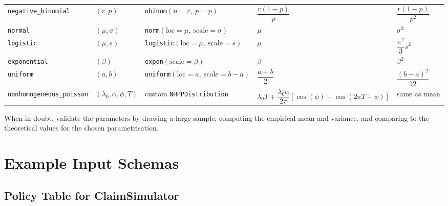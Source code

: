 \begin{longtable}[htbp]
\begin{tabularx}{\textwidth}{llllX}
  \texttt{negative\_binomial} 
  & $(r, p)$ 
  & \texttt{nbinom}$(n=r,\ p=p)$ 
  & $\dfrac{r(1-p)}{p}$ 
  & $\dfrac{r(1-p)}{p^2}$ \\
  
  \texttt{normal} 
  & $(\mu, \sigma)$ 
  & \texttt{norm}$(\text{loc}=\mu,\ \text{scale}=\sigma)$ 
  & $\mu$ 
  & $\sigma^2$ \\
  
  \texttt{logistic} 
  & $(\mu, s)$ 
  & \texttt{logistic}$(\text{loc}=\mu,\ \text{scale}=s)$ 
  & $\mu$ 
  & $\dfrac{\pi^2}{3}s^2$ \\
  
  \texttt{exponential} 
  & $(\beta)$ 
  & \texttt{expon}$(\text{scale}=\beta)$ 
  & $\beta$ 
  & $\beta^2$ \\
  
  \texttt{uniform} 
  & $(a, b)$ 
  & \texttt{uniform}$(\text{loc}=a,\ \text{scale}=b-a)$ 
  & $\dfrac{a+b}{2}$ 
  & $\dfrac{(b-a)^2}{12}$ \\
  
  \texttt{nonhomogeneous\_poisson} 
  & $(\lambda_0, \alpha, \phi, T)$ 
  & custom \texttt{NHPPDistribution} 
  & $\lambda_0 T + \dfrac{\lambda_0\alpha}{2\pi}
  \left[\cos(\phi)-\cos(2\pi T+\phi)\right]$ 
  & same as mean \\
  
  \bottomrule
  \end{tabularx}
  \caption{Actuarial parameterizations and SciPy equivalents for supported distributions.}
  \label{tab:actuarial_scipy_distributions}
  \end{longtable}

When in doubt, validate the parameters by drawing a large sample,
computing the empirical mean and variance, and comparing to the
theoretical values for the chosen parametrisation.

\section{Example Input Schemas}
\label{app:input_schemas}

\subsection*{Policy Table for ClaimSimulator}

